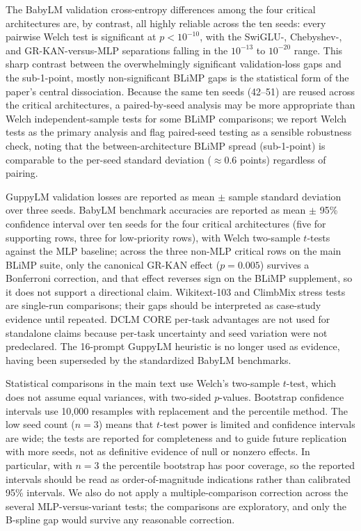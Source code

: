 \documentclass[11pt]{article}
\newcommand{\modelname}[1]{\textsc{#1}}
\newcommand{\grkan}{\modelname{GR-KAN}}
\begin{document}
The BabyLM validation cross-entropy differences among the four critical architectures are, by contrast, all highly reliable across the ten seeds: every pairwise Welch test is significant at \(p<10^{-10}\), with the SwiGLU-, Chebyshev-, and \grkan{}-versus-MLP separations falling in the \(10^{-13}\) to \(10^{-20}\) range. This sharp contrast between the overwhelmingly significant validation-loss gaps and the sub-1-point, mostly non-significant BLiMP gaps is the statistical form of the paper's central dissociation. Because the same ten seeds (42--51) are reused across the critical architectures, a paired-by-seed analysis may be more appropriate than Welch independent-sample tests for some BLiMP comparisons; we report Welch tests as the primary analysis and flag paired-seed testing as a sensible robustness check, noting that the between-architecture BLiMP spread (sub-1-point) is comparable to the per-seed standard deviation (\(\approx\)0.6 points) regardless of pairing.

GuppyLM validation losses are reported as mean \(\pm\) sample standard deviation over three seeds. BabyLM benchmark accuracies are reported as mean \(\pm\) 95\% confidence interval over ten seeds for the four critical architectures (five for supporting rows, three for low-priority rows), with Welch two-sample \(t\)-tests against the MLP baseline; across the three non-MLP critical rows on the main BLiMP suite, only the canonical \grkan{} effect (\(p=0.005\)) survives a Bonferroni correction, and that effect reverses sign on the BLiMP supplement, so it does not support a directional claim. Wikitext-103 and ClimbMix stress tests are single-run comparisons; their gaps should be interpreted as case-study evidence until repeated. DCLM CORE per-task advantages are not used for standalone claims because per-task uncertainty and seed variation were not predeclared. The 16-prompt GuppyLM heuristic is no longer used as evidence, having been superseded by the standardized BabyLM benchmarks.

Statistical comparisons in the main text use Welch's two-sample \(t\)-test, which does not assume equal variances, with two-sided \(p\)-values. Bootstrap confidence intervals use 10,000 resamples with replacement and the percentile method. The low seed count (\(n=3\)) means that \(t\)-test power is limited and confidence intervals are wide; the tests are reported for completeness and to guide future replication with more seeds, not as definitive evidence of null or nonzero effects. In particular, with \(n=3\) the percentile bootstrap has poor coverage, so the reported intervals should be read as order-of-magnitude indications rather than calibrated 95\% intervals. We also do not apply a multiple-comparison correction across the several MLP-versus-variant tests; the comparisons are exploratory, and only the B-spline gap would survive any reasonable correction.
\end{document}
